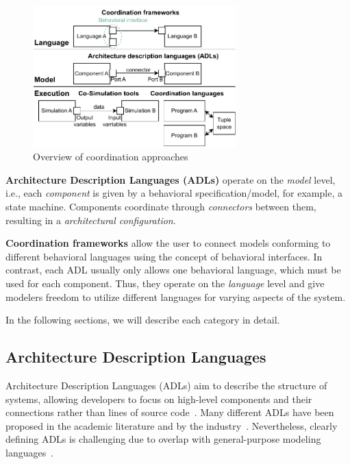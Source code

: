 \documentclass[runningheads]{llncs}
\begin{document}
\begin{figure}[ht]
	\centering
	\includegraphics[width=0.7\textwidth]{images/overview}
	\caption{Overview of coordination approaches}
	\label{fig:overview}
\end{figure}

\textbf{Architecture Description Languages (ADLs)} operate on the \textit{model} level, i.e., each \textit{component} is given by a behavioral specification/model, for example, a state machine.
Components coordinate through \textit{connectors} between them, resulting in a \textit{architectural configuration}.

\textbf{Coordination frameworks} allow the user to connect models conforming to different behavioral languages using the concept of behavioral interfaces.
In contrast, each ADL usually only allows one behavioral language, which must be used for each component.
Thus, they operate on the \textit{language} level and give modelers freedom to utilize different languages for varying aspects of the system.

In the following sections, we will describe each category in detail.

\subsection{Architecture Description Languages} \label{subsec:adl}
Architecture Description Languages (ADLs) aim to describe the structure of systems, allowing developers to focus on high-level components and their connections rather than lines of source code~\cite{clementsSurveyArchitectureDescription1996,medvidovicClassificationComparisonFramework2000,medvidovicFrameworkClassifyingComparing1997}.
Many different ADLs have been proposed in the academic literature and by the industry~\cite{medvidovicClassificationComparisonFramework2000,woodsArchitectureDescriptionLanguages2005}.
Nevertheless, clearly defining ADLs is challenging due to overlap with general-purpose modeling languages~\cite{clementsSurveyArchitectureDescription1996}.
\end{document}
